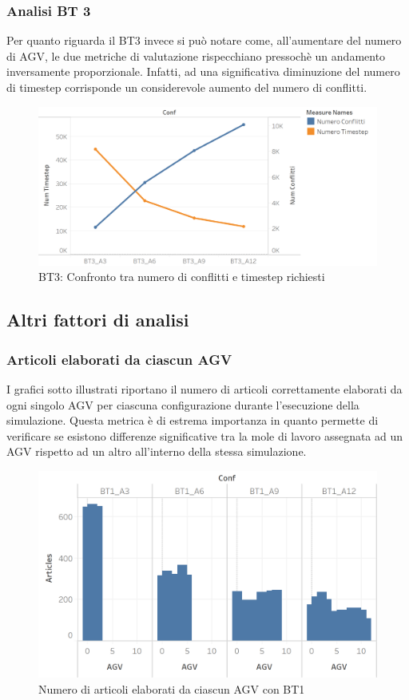 \documentclass[12pt]{article}
\begin{document}
\subsubsection{Analisi BT 3}
Per quanto riguarda il BT3 invece si può notare come, all'aumentare del numero di AGV, le due metriche di valutazione rispecchiano pressochè un andamento inversamente proporzionale. Infatti, ad una significativa diminuzione del numero di timestep corrisponde un considerevole aumento del numero di conflitti.
\begin{figure}[H]
\centering
  \includegraphics[width=1\linewidth]{Figures/Results_Graphics/BT3_TimeConflicts.png}
  \caption{BT3: Confronto tra numero di conflitti e timestep richiesti}\label{fig:BT3_TimeConflicts}
\end{figure}

\newpage
\subsection{Altri fattori di analisi}
\subsubsection{Articoli elaborati da ciascun AGV}
\noindent I grafici sotto illustrati riportano il numero di articoli correttamente elaborati da ogni singolo AGV per ciascuna configurazione durante l'esecuzione della simulazione. Questa metrica è di estrema importanza in quanto permette di verificare se esistono differenze significative tra la mole di lavoro assegnata ad un AGV rispetto ad un altro all'interno della stessa simulazione.

\begin{figure}[H]
\centering
  \includegraphics[width=0.8\linewidth]{Figures/Results_Graphics/Articles_BT1.png}
  \caption{Numero di articoli elaborati da ciascun AGV con BT1}\label{fig:articles_agv_bt1}
\end{figure}
\end{document}
